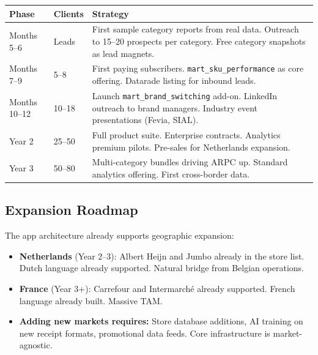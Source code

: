 \documentclass[11pt,a4paper]{article}
\begin{document}
\begin{center}
\renewcommand{\arraystretch}{1.3}
\begin{tabularx}{\textwidth}{C{2cm} C{2cm} L{9cm}}
\toprule
{}
\textbf{\color{white}Phase} & \textbf{\color{white}Clients} & \textbf{\color{white}Strategy} \\
\midrule
Months 5--6 & Leads & First sample category reports from real data. Outreach to 15--20 prospects per category. Free category snapshots as lead magnets. \\
Months 7--9 & 5--8 & First paying subscribers. \texttt{mart\_sku\_performance} as core offering. Datarade listing for inbound leads. \\
Months 10--12 & 10--18 & Launch \texttt{mart\_brand\_switching} add-on. LinkedIn outreach to brand managers. Industry event presentations (Fevia, SIAL). \\
Year 2 & 25--50 & Full product suite. Enterprise contracts. Analytics premium pilots. Pre-sales for Netherlands expansion. \\
Year 3 & 50--80 & Multi-category bundles driving ARPC up. Standard analytics offering. First cross-border data. \\
\bottomrule
\end{tabularx}
\end{center}

\subsection{Expansion Roadmap}

The app architecture already supports geographic expansion:

\begin{itemize}[leftmargin=1.5em, itemsep=3pt]
  \item \textbf{Netherlands} (Year 2--3): Albert Heijn and Jumbo already in the store list. Dutch language already supported. Natural bridge from Belgian operations.
  \item \textbf{France} (Year 3+): Carrefour and Intermarch\'{e} already supported. French language already built. Massive TAM.
  \item \textbf{Adding new markets requires:} Store database additions, AI training on new receipt formats, promotional data feeds. Core infrastructure is market-agnostic.
\end{itemize}

\clearpage

\end{document}
